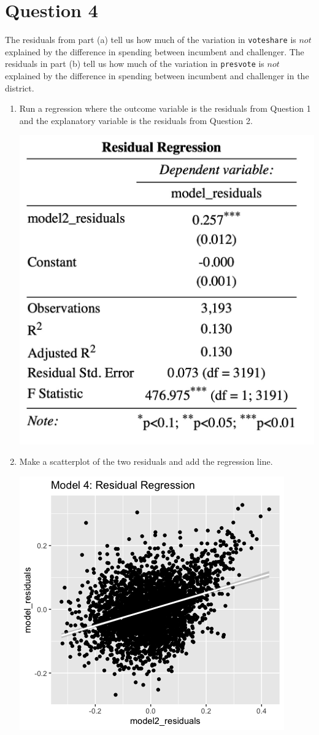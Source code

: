 \documentclass[12pt,letterpaper]{article}
\begin{document}
\newpage	
\section*{Question 4}
\noindent The residuals from part (a) tell us how much of the variation in \texttt{voteshare} is $not$ explained by the difference in spending between incumbent and challenger. The residuals in part (b) tell us how much of the variation in \texttt{presvote} is $not$ explained by the difference in spending between incumbent and challenger in the district.
	\begin{enumerate}
		\item Run a regression where the outcome variable is the residuals from Question 1 and the explanatory variable is the residuals from Question 2.	
			 
			\includegraphics[width=.8\textwidth]{model_4.jpg}
		\vspace{6cm}
		\item Make a scatterplot of the two residuals and add the regression line. 	
			 
		\centering
		\includegraphics[width=.8\textwidth]{plot4.png}

\end{enumerate}
\end{document}

